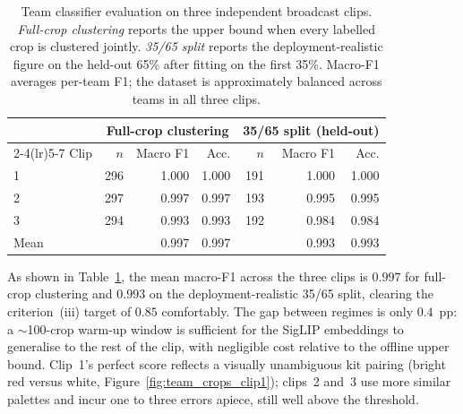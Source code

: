 \begin{table}[h]
\centering
\small
\begin{tabular}{lrrrrrr}
\toprule
& \multicolumn{3}{c}{Full-crop clustering} & \multicolumn{3}{c}{35/65 split (held-out)} \\
\cmidrule(lr){2-4}\cmidrule(lr){5-7}
Clip & $n$ & Macro F1 & Acc. & $n$ & Macro F1 & Acc. \\
\midrule
1     & 296 & 1.000 & 1.000 & 191 & 1.000 & 1.000 \\
2     & 297 & 0.997 & 0.997 & 193 & 0.995 & 0.995 \\
3     & 294 & 0.993 & 0.993 & 192 & 0.984 & 0.984 \\
\midrule
Mean  &     & 0.997 & 0.997 &     & 0.993 & 0.993 \\
\bottomrule
\end{tabular}
\caption[Team classifier: full-crop clustering and warm-up-split
results across three clips.]{Team classifier evaluation on three
independent broadcast clips. \emph{Full-crop clustering} reports the
upper bound when every labelled crop is clustered jointly.
\emph{35/65 split} reports the deployment-realistic figure on the
held-out 65\% after fitting on the first 35\%. Macro-F1 averages
per-team F1; the dataset is approximately balanced across teams in
all three clips.}
\label{tab:team_classifier}
\end{table}

As shown in Table~\ref{tab:team_classifier}, the mean macro-F1 across the three clips is $0.997$ for full-crop
clustering and $0.993$ on the deployment-realistic 35/65 split,
clearing the criterion~(iii) target of $0.85$ comfortably. The gap
between regimes is only $0.4$~pp: a $\sim$100-crop warm-up window is
sufficient for the SigLIP embeddings to generalise to the rest of the
clip, with negligible cost relative to the offline upper bound.
Clip~1's perfect score reflects a visually unambiguous kit pairing
(bright red versus white, Figure~\ref{fig:team_crops_clip1}); clips~2
and~3 use more similar palettes and incur one to three errors apiece,
still well above the threshold.

